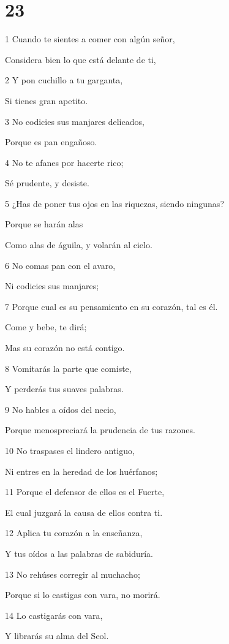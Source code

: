 \chapter{23}

\par 1 Cuando te sientes a comer con algún señor,
\par Considera bien lo que está delante de ti,
\par 2 Y pon cuchillo a tu garganta,
\par Si tienes gran apetito.
\par 3 No codicies sus manjares delicados,
\par Porque es pan engañoso.
\par 4 No te afanes por hacerte rico;
\par Sé prudente, y desiste.
\par 5 ¿Has de poner tus ojos en las riquezas, siendo ningunas?
\par Porque se harán alas
\par Como alas de águila, y volarán al cielo.
\par 6 No comas pan con el avaro,
\par Ni codicies sus manjares;
\par 7 Porque cual es su pensamiento en su corazón, tal es él.
\par Come y bebe, te dirá;
\par Mas su corazón no está contigo.
\par 8 Vomitarás la parte que comiste,
\par Y perderás tus suaves palabras.
\par 9 No hables a oídos del necio,
\par Porque menospreciará la prudencia de tus razones.
\par 10 No traspases el lindero antiguo,
\par Ni entres en la heredad de los huérfanos;
\par 11 Porque el defensor de ellos es el Fuerte,
\par El cual juzgará la causa de ellos contra ti.
\par 12 Aplica tu corazón a la enseñanza,
\par Y tus oídos a las palabras de sabiduría.
\par 13 No rehúses corregir al muchacho;
\par Porque si lo castigas con vara, no morirá.
\par 14 Lo castigarás con vara,
\par Y librarás su alma del Seol.
